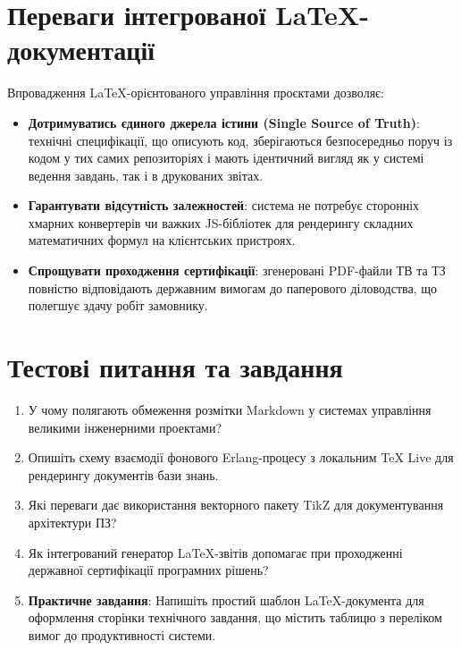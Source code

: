\section{Переваги інтегрованої LaTeX-документації}
Впровадження LaTeX-орієнтованого управління проєктами дозволяє:
\begin{itemize}
    \item \textbf{Дотримуватись єдиного джерела істини (Single Source of Truth)}: технічні специфікації, що описують код, зберігаються безпосередньо поруч із кодом у тих самих репозиторіях і мають ідентичний вигляд як у системі ведення завдань, так і в друкованих звітах.
    \item \textbf{Гарантувати відсутність залежностей}: система не потребує сторонніх хмарних конвертерів чи важких JS-бібліотек для рендерингу складних математичних формул на клієнтських пристроях.
    \item \textbf{Спрощувати проходження сертифікації}: згенеровані PDF-файли ТВ та ТЗ повністю відповідають державним вимогам до паперового діловодства, що полегшує здачу робіт замовнику.
\end{itemize}

\section{Тестові питання та завдання}
\begin{enumerate}
    \item У чому полягають обмеження розмітки Markdown у системах управління великими інженерними проектами?
    \item Опишіть схему взаємодії фонового Erlang-процесу з локальним TeX Live для рендерингу документів бази знань.
    \item Які переваги дає використання векторного пакету TikZ для документування архітектури ПЗ?
    \item Як інтегрований генератор LaTeX-звітів допомагає при проходженні державної сертифікації програмних рішень?
    \item \textbf{Практичне завдання}: Напишіть простий шаблон LaTeX-документа для оформлення сторінки технічного завдання, що містить таблицю з переліком вимог до продуктивності системи.
\end{enumerate}
